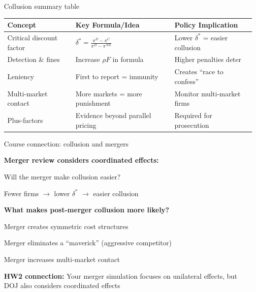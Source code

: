\documentclass[notes,11pt, aspectratio=169]{beamer}
\newenvironment{wideitemize}{\itemize\addtolength{\itemsep}{10pt}}{\enditemize}
\begin{document}
\begin{frame}{Collusion summary table}
	\begin{center}
		\small
		\begin{tabular}{|p{3.5cm}|p{4cm}|p{4cm}|}
			\hline
			\textbf{Concept} & \textbf{Key Formula/Idea} & \textbf{Policy Implication} \\
			\hline
			Critical discount factor & $\delta^* = \frac{\pi^D - \pi^C}{\pi^D - \pi^{NE}}$ & Lower $\delta^*$ = easier collusion \\
			\hline
			Detection \& fines & Increase $\rho F$ in formula & Higher penalties deter \\
			\hline
			Leniency & First to report = immunity & Creates ``race to confess'' \\
			\hline
			Multi-market contact & More markets = more punishment & Monitor multi-market firms \\
			\hline
			Plus-factors & Evidence beyond parallel pricing & Required for prosecution \\
			\hline
		\end{tabular}
	\end{center}
\end{frame}

\begin{frame}{Course connection: collusion and mergers}
	\begin{wideitemize}
		\item \textbf{Merger review considers coordinated effects:}
		\begin{wideitemize}
			\vspace{5pt}
			\item Will the merger make collusion easier?
			\item Fewer firms $\rightarrow$ lower $\delta^*$ $\rightarrow$ easier collusion
		\end{wideitemize}
		\item \textbf{What makes post-merger collusion more likely?}
		\begin{wideitemize}
			\vspace{5pt}
			\item Merger creates symmetric cost structures
			\item Merger eliminates a ``maverick'' (aggressive competitor)
			\item Merger increases multi-market contact
		\end{wideitemize}
		\item \textbf{HW2 connection:} Your merger simulation focuses on unilateral effects, but DOJ also considers coordinated effects
	\end{wideitemize}
\end{frame}
\end{document}
